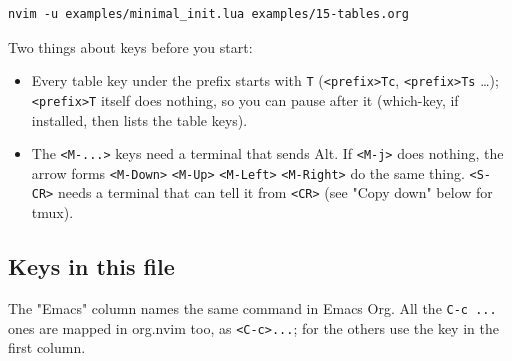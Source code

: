 \begin{verbatim}
nvim -u examples/minimal_init.lua examples/15-tables.org
\end{verbatim}

Two things about keys before you start:

\begin{itemize}
\item Every table key under the prefix starts with \texttt{T} (\texttt{<prefix>Tc},
\texttt{<prefix>Ts} \ldots{}); \texttt{<prefix>T} itself does nothing, so you can pause after
it (which-key, if installed, then lists the table keys).
\item The \texttt{<M-...>} keys need a terminal that sends Alt. If \texttt{<M-j>} does
nothing, the arrow forms \texttt{<M-Down>} \texttt{<M-Up>} \texttt{<M-Left>} \texttt{<M-Right>} do the
same thing. \texttt{<S-CR>} needs a terminal that can tell it from \texttt{<CR>} (see
"Copy down" below for tmux).
\end{itemize}
\subsection{Keys in this file}
\label{sec:org6f3b54d}
The "Emacs" column names the same command in Emacs Org. All the \texttt{C-c ...}
ones are mapped in org.nvim too, as \texttt{<C-c>...}; for the others use the key
in the first column.


